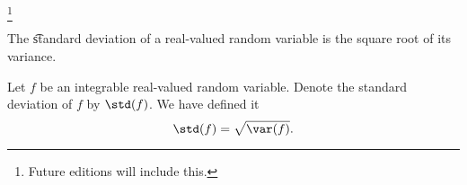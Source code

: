 

\footnote{Future editions will include this.}


The \t{standard deviation} of a real-valued random variable is the square root of its variance.


Let $f$ be an
integrable real-valued
random variable.
Denote the
standard deviation
of $f$ by
$\std(f)$.
We have defined it
\[
  \std(f) = \sqrt{\var(f)}.
\]

\blankpage
